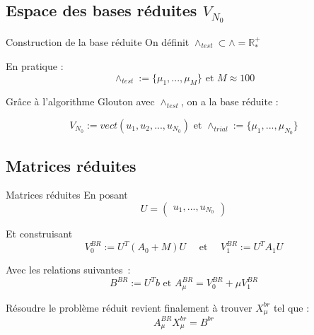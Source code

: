 \documentclass[10pt]{beamer}
\begin{document}
\subsection{Espace des bases réduites $V_{N_{0}}$}



\begin{frame}{Construction de la base réduite}
On définit  $ \wedge_{test} \subset \wedge = \mathbb{R_{*}^{+}}$

\noindent En pratique : 
$$\wedge_{test} := \{\mu_1,..., \mu_{M} \} \text{ et } M \approx 100$$ 

Grâce à l'algorithme Glouton avec $\wedge_{test}$, on a la base réduite  :

$$ V_{N_{0}} := vect(u_1,u_2,..., u_{N_0}) \text{ et } \wedge_{trial} := \{\mu_1,..., \mu_{N_{0}} \}$$



\end{frame}




\subsection{Matrices réduites}


\begin{frame}{Matrices réduites}
\noindent En posant
$$
U = \begin{pmatrix}
u_1, ..., u_{N_0}
\end{pmatrix} 
$$

\noindent Et construisant 
$$
V_{0}^{BR} := U^{T}(A_0 + M)U  \quad \text{   et   }  \quad  V_{1}^{BR} := U^{T}A_1U
$$

\noindent Avec les relations suivantes :
$$
B^{BR} := U^{T}b \text{    et    } A^{BR}_{\mu} = V_{0}^{BR} + \mu V_{1}^{BR}
$$

\noindent Résoudre le problème réduit  revient finalement à trouver $X^{br}_{\mu}$ tel que :
$$A^{BR}_{\mu} X^{br}_{\mu} = B^{br} $$ 




\end{frame}


\begin{comment}

\noindent À l’étape hors-ligne, le vecteur $B^{BR}$ et les matrices $V_{0}^{BR}$ et $V_{1}^{BR}$ sont calculées une seule fois. À l’étape en-ligne, pour un certain $\mu \in P_{trial}$, on assemble la matrice $A^{BR}_{\mu}$ et resout le système réduit $$A^{BR}_{\mu} X^{BR} = B^{BR}$$

\end{comment}
\end{document}
